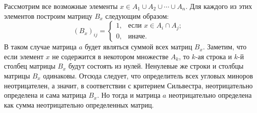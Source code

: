 \documentclass{article}
\begin{document}
Рассмотрим все возможные элементы $x \in A_1 \cup A_2 \cup \cdots \cup A_n$. Для каждого из этих элементов построим матрицу $B_x$ следующим образом:
$$(B_x)_{ij} = \begin{cases}1,&\textrm{если }x \in A_i \cap A_j;\\0,&\textrm{иначе}.\end{cases}$$
В таком случае матрица $a$ будет являться суммой всех матриц $B_x$. Заметим, что если элемент $x$ не содержится в некотором множестве $A_k$, то $k$-ая строка и $k$-й столбец матрицы $B_x$ будут состоять из нулей. Ненулевые же строки и столбцы матрицы $B_x$ одинаковы. Отсюда следует, что определитель всех угловых миноров неотрицателен, а значит, в соответствии с критерием Сильвестра, неотрицательно определена и сама матрица $B_x$. Но тогда и матрица $a$ неотрицательно определена как сумма неотрицательно определенных матриц.
\end{document}
